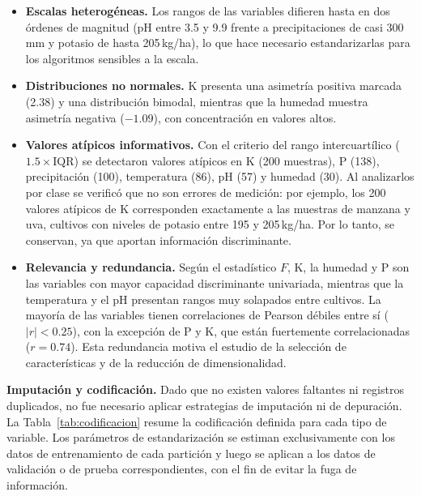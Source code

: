 \documentclass[conference]{IEEEtran}
\begin{document}
\begin{itemize}
    \item \textbf{Escalas heterogéneas.} Los rangos de las variables difieren hasta en dos órdenes de magnitud (pH entre 3.5 y 9.9 frente a precipitaciones de casi 300\,mm y potasio de hasta 205\,kg/ha), lo que hace necesario estandarizarlas para los algoritmos sensibles a la escala.
    \item \textbf{Distribuciones no normales.} K presenta una asimetría positiva marcada (2.38) y una distribución bimodal, mientras que la humedad muestra asimetría negativa ($-1.09$), con concentración en valores altos.
    \item \textbf{Valores atípicos informativos.} Con el criterio del rango intercuartílico ($1.5\times\mathrm{IQR}$) se detectaron valores atípicos en K (200 muestras), P (138), precipitación (100), temperatura (86), pH (57) y humedad (30). Al analizarlos por clase se verificó que no son errores de medición: por ejemplo, los 200 valores atípicos de K corresponden exactamente a las muestras de manzana y uva, cultivos con niveles de potasio entre 195 y 205\,kg/ha. Por lo tanto, se conservan, ya que aportan información discriminante.
    \item \textbf{Relevancia y redundancia.} Según el estadístico $F$, K, la humedad y P son las variables con mayor capacidad discriminante univariada, mientras que la temperatura y el pH presentan rangos muy solapados entre cultivos. La mayoría de las variables tienen correlaciones de Pearson débiles entre sí ($|r|<0.25$), con la excepción de P y K, que están fuertemente correlacionadas ($r=0.74$). Esta redundancia motiva el estudio de la selección de características y de la reducción de dimensionalidad.
\end{itemize}

\textbf{Imputación y codificación.} Dado que no existen valores faltantes ni registros duplicados, no fue necesario aplicar estrategias de imputación ni de depuración. La Tabla~\ref{tab:codificacion} resume la codificación definida para cada tipo de variable. Los parámetros de estandarización se estiman exclusivamente con los datos de entrenamiento de cada partición y luego se aplican a los datos de validación o de prueba correspondientes, con el fin de evitar la fuga de información.
\end{document}
